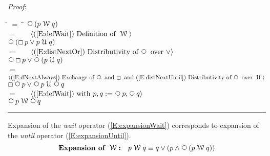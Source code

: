 \documentclass[12pt, fleqn, leqno]{article}
\newcommand{\lgap}{2pt}                             %
\newcommand{\mymathindent}{24pt}                    %
\newcommand{\Until}{\;\mathcal{U}\;}
\newcommand{\Wait}{\;\mathcal{W}\;}
\newcommand{\Next}{\;\,\text{\raisebox{3.5pt}{\circle{6}}}}
\newcommand{\Always}{\Box\,}
\newcommand{\myqed}{\rule[-.23ex]{1.2ex}{2.0ex}}
\newcommand{\myqedtab}{\hspace{384pt}}              %
\newcommand{\Gll} {\langle}                         %
\newcommand{\Ggg} {\rangle}                         %
\newcommand{\Hint}[1]     {\ \ \ $\Gll              \mbox{#1} \Ggg$ }   %
\begin{document}
\emph{Proof}:
\begin{tabbing}
\hspace{\mymathindent} \= $= \;$ \= \myqedtab \= \kill
\> \> $\Next (p \Wait q)$\\[\lgap]
\> $=$ \> \Hint{(\ref{E:defWait}) Definition of $\Wait$} \\[\lgap]
\> \> $\Next(\Always p\lor p\Until q)$\\[\lgap]
\> $=$ \> \Hint{(\ref{E:distNextOr}) Distributivity of $\Next$ over $\lor$} \\[\lgap]
\> \> $\Next \Always p\lor \Next(p\Until q)$\\[\lgap]
\> $=$ \> \Hint{(\ref{E:dNextAlways}) Exchange of $\Next$ and $\Always$ and (\ref{E:distNextUntil}) Distributivity of $\Next$ over $\Until$} \\[\lgap]
\> \> $\Always \Next p\lor \Next p\Until \Next q$\\[\lgap]
\> $=$ \> \Hint{(\ref{E:defWait}) with $p,q := \Next p, \Next q$} \\[\lgap]
\> \> $\Next p \Wait \Next q$ \quad \myqed
\end{tabbing}

Expansion of the \textit{wait} operator (\ref{E:expansionWait}) corresponds to expansion of the \textit{until} operator (\ref{E:expansionUntil}).
\begin{equation}\label{E:expansionWait}
\textbf{Expansion of $\Wait$:}\quad p \Wait q \equiv q \lor (p \land \Next (p \Wait q))
\end{equation}
\end{document}
